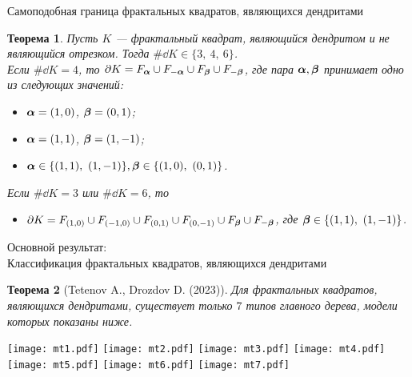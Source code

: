 \documentclass[aspectratio=1610, 10pt, notheorems]{beamer}
\newtheorem{theorem}     {Теорема}
\begin{document}
\begin{frame}{Самоподобная граница  фрактальных квадратов, являющихся дендритами}
\begin{theorem}\label{ssboundary}
Пусть $K$ --- фрактальный квадрат, являющийся дендритом и не являющийся отрезком.
Тогда $\#\dd K\in\{3,\ 4,\ 6\}$. \\
Если $\#\dd K=4$, то  $\partial K=F_{\bm{\alpha}}\cup F_{-{\bm{\alpha}}}\cup F_{\bm{\beta}}\cup F_{-{\bm{\beta}}}$, где   пара  ${\bm{\alpha}},{\bm{\beta}}$ принимает одно из следующих значений:
	\begin{itemize}[nolistsep]
	\item[{\bf A.}] ${\bm{\alpha}}=(1,0)$, $ {\bm{\beta}}=(0,1)$;
	\item[{\bf B.}] ${\bm{\alpha}}=(1,1)$, $ {\bm{\beta}}=(1,-1)$;
	\item[{\bf C.}] $\bma\in\{(1,1),\ (1,-1)\},\bmb\in\{(1,0),\ (0,1)\}$.
	\end{itemize}
 Если $\#\dd K=3$ или $\#\dd K=6$, то
\begin{itemize}[nolistsep]
	\item[{\bf D.}] $\partial K=F_{(1,0)}\cup F_{(-1,0)}\cup F_{(0,1)}\cup F_{(0,-1)}\cup F_{\bm{\beta}}\cup F_{-{\bm{\beta}}}$, где ${\bm{\beta}}\in\{(1,1),\ (1,-1)\}$.
	\end{itemize}
\end{theorem}
\end{frame}


\begin{frame}{
}
\begin{center}
\end{center}
\end{frame}


\begin{frame}{Основной результат:\\Классификация фрактальных квадратов, являющихся дендритами}

\begin{theorem}[Tetenov A., Drozdov D.  (2023)]
Для фрактальных квадратов, являющихся дендритами, существует только $7$ типов главного дерева, модели которых показаны ниже.
\end{theorem}
\texttt{[image: mt1.pdf]}
\hfill
\texttt{[image: mt2.pdf]}
\hfill
\texttt{[image: mt3.pdf]}
\hfill
\texttt{[image: mt4.pdf]}\\
\texttt{[image: mt5.pdf]}
\hfill
\texttt{[image: mt6.pdf]}
\hfill
\texttt{[image: mt7.pdf]}
\end{frame}
\end{document}

